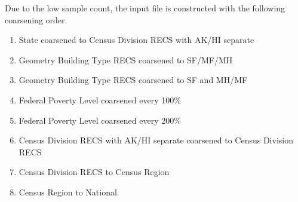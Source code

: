 Due to the low sample count, the input file is constructed with the following coarsening order.
\begin{enumerate}
    \item  State coarsened to Census Division RECS with AK/HI separate
    \item  Geometry Building Type RECS coarsened to SF/MF/MH
    \item Geometry Building Type RECS coarsened to SF and MH/MF
    \item  Federal Poverty Level coarsened every 100\%
    \item  Federal Poverty Level coarsened every 200\%
    \item Census Division RECS with AK/HI separate coarsened to Census Division RECS
    \item  Census Division RECS to Census Region
    \item Census Region to National.
\end{enumerate}
